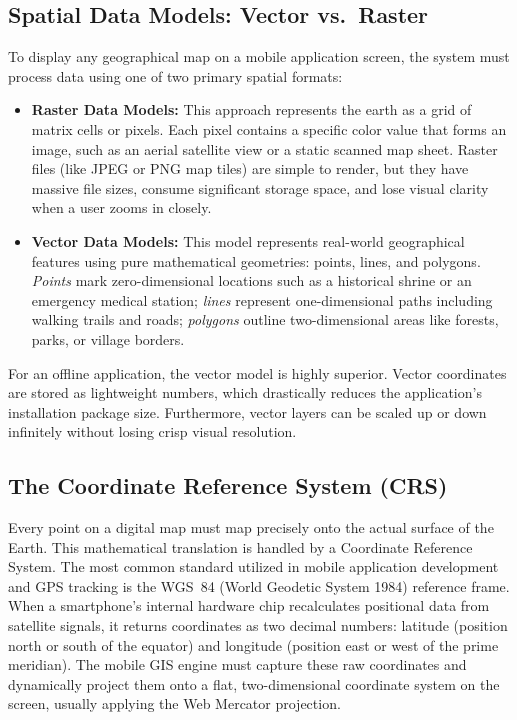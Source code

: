 \documentclass[12pt,a4paper,oneside]{report}
\begin{document}
\subsection{Spatial Data Models: Vector vs.\ Raster}

To display any geographical map on a mobile application screen, the system must process
data using one of two primary spatial formats:

\begin{itemize}[leftmargin=1.4em]
  \item \textbf{Raster Data Models:} This approach represents the earth as a grid of
        matrix cells or pixels. Each pixel contains a specific color value that forms an
        image, such as an aerial satellite view or a static scanned map sheet. Raster
        files (like JPEG or PNG map tiles) are simple to render, but they have massive
        file sizes, consume significant storage space, and lose visual clarity when a user
        zooms in closely.
  \item \textbf{Vector Data Models:} This model represents real-world geographical
        features using pure mathematical geometries: points, lines, and polygons.
        \emph{Points} mark zero-dimensional locations such as a historical shrine or an
        emergency medical station; \emph{lines} represent one-dimensional paths including
        walking trails and roads; \emph{polygons} outline two-dimensional areas like
        forests, parks, or village borders.
\end{itemize}

For an offline application, the vector model is highly superior. Vector coordinates are
stored as lightweight numbers, which drastically reduces the application's installation
package size. Furthermore, vector layers can be scaled up or down infinitely without
losing crisp visual resolution.

\subsection{The Coordinate Reference System (CRS)}

Every point on a digital map must map precisely onto the actual surface of the Earth.
This mathematical translation is handled by a Coordinate Reference System. The most
common standard utilized in mobile application development and GPS tracking is the WGS~84
(World Geodetic System 1984) reference frame. When a smartphone's internal hardware chip
recalculates positional data from satellite signals, it returns coordinates as two
decimal numbers: latitude (position north or south of the equator) and longitude
(position east or west of the prime meridian). The mobile GIS engine must capture these
raw coordinates and dynamically project them onto a flat, two-dimensional coordinate
system on the screen, usually applying the Web Mercator projection.
\end{document}
